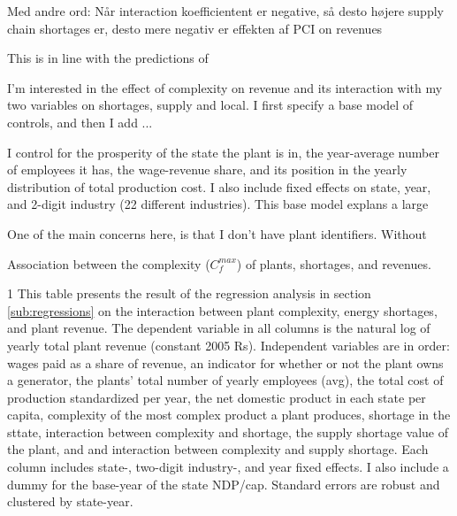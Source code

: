 \documentclass[11pt]{article}
\begin{document}
Med andre ord: Når interaction koefficientent er negative, så desto højere supply chain shortages er, desto mere negativ er effekten af PCI on revenues


This is in line with the predictions of 





I'm interested in the effect of complexity on revenue and its interaction with my two variables on shortages, supply and local. 
I first specify a base model of controls, and then I add ...

I control for the prosperity of the state the plant is in, the year-average number of employees it has, the wage-revenue share, and its position in the yearly distribution of total production cost. I also include fixed effects on state, year, and 2-digit industry (22 different industries). This base model explans a large 

One of the main concerns here, is that I don't have plant identifiers. Without 

\begin{sidewaystable}
	\begin{center}
		\begin{threeparttable}
		\caption{Association between the complexity ($C^{max}_{f}$) of plants, shortages, and revenues.}
			\label{tab:interaction_max_pci}
			
			\begin{tablenotes} \footnotesize
			\item[1] This table presents the result of the regression analysis in section \ref{sub:regressions} on the interaction between plant complexity, energy shortages, and plant revenue. The dependent variable in all columns is the natural log of yearly total plant revenue (constant 2005 Rs). Independent variables are in order: wages paid as a share of revenue, an indicator for whether or not the plant owns a generator, the plants' total number of yearly employees (avg), the total cost of production standardized per year, the net domestic product in each state per capita, complexity of the most complex product a plant produces, shortage in the sttate, interaction between complexity and shortage, the supply shortage value of the plant, and and interaction between complexity and supply shortage. Each column includes state-, two-digit industry-, and year fixed effects. I also include a dummy for the base-year of the state NDP/cap. Standard errors are robust and clustered by state-year.
			\end{tablenotes}
		\end{threeparttable}
	\end{center}
\end{sidewaystable}
\end{document}
